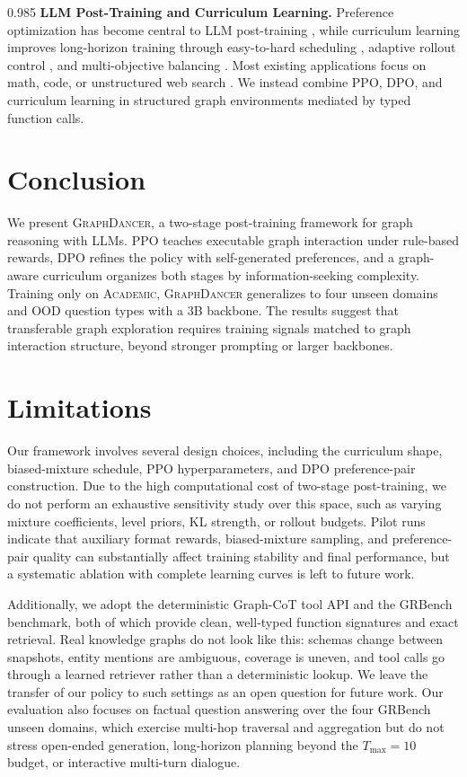 \documentclass[11pt]{article}
\newcommand{\ours}{\textsc{GraphDancer}\xspace}
\begin{document}
\begin{spacing}{0.985}
\smallskip
\noindent \textbf{LLM Post-Training and Curriculum Learning.}
Preference optimization \citep{schulman2017proximal,rafailov2023direct,shao2024deepseekmath,yu2026dapo} has become central to LLM post-training \citep{ouyang2022training,guo2025deepseek}, while curriculum learning \citep{bengio2009curriculum} improves long-horizon training through easy-to-hard scheduling \citep{parashar2025curriculum}, adaptive rollout control \citep{shen2025thinking}, and multi-objective balancing \citep{hammoud2025train}.
Most existing applications focus on math, code, or unstructured web search \citep{jin2025search}. We instead combine PPO, DPO, and curriculum learning in structured graph environments mediated by typed function calls.

\section{Conclusion}
We present \ours, a two-stage post-training framework for graph reasoning with LLMs.
PPO teaches executable graph interaction under rule-based rewards, DPO refines the policy with self-generated preferences, and a graph-aware curriculum organizes both stages by information-seeking complexity.
Training only on \textsc{Academic}, \ours generalizes to four unseen domains and OOD question types with a 3B backbone.
The results suggest that transferable graph exploration requires training signals matched to graph interaction structure, beyond stronger prompting or larger backbones.

\end{spacing}

\section*{Limitations}
\label{sec:limitations}
Our framework involves several design choices, including the curriculum shape, biased-mixture schedule, PPO hyperparameters, and DPO preference-pair construction. Due to the high computational cost of two-stage post-training, we do not perform an exhaustive sensitivity study over this space, such as varying mixture coefficients, level priors, KL strength, or rollout budgets. Pilot runs indicate that auxiliary format rewards, biased-mixture sampling, and preference-pair quality can substantially affect training stability and final performance, but a systematic ablation with complete learning curves is left to future work.

Additionally, we adopt the deterministic Graph-CoT tool API and the GRBench benchmark, both of which provide clean, well-typed function signatures and exact retrieval. Real knowledge graphs do not look like this: schemas change between snapshots, entity mentions are ambiguous, coverage is uneven, and tool calls go through a learned retriever rather than a deterministic lookup. We leave the transfer of our policy to such settings as an open question for future work. Our evaluation also focuses on factual question answering over the four GRBench unseen domains, which exercise multi-hop traversal and aggregation but do not stress open-ended generation, long-horizon planning beyond the $T_{\max}{=}10$ budget, or interactive multi-turn dialogue.
\end{document}
